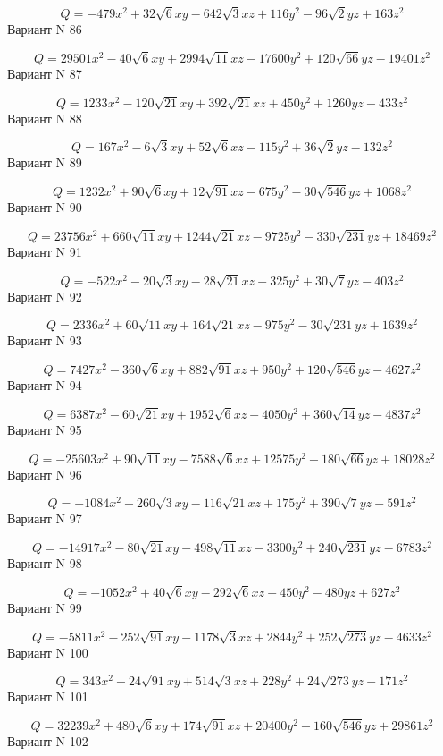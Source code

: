 \documentclass[11pt]{report}
\begin{document}
$$Q = - 479 x^{2} + 32 \sqrt{6} x y - 642 \sqrt{3} x z + 116 y^{2} - 96 \sqrt{2} y z + 163 z^{2}$$Вариант N 86

$$Q = 29501 x^{2} - 40 \sqrt{6} x y + 2994 \sqrt{11} x z - 17600 y^{2} + 120 \sqrt{66} y z - 19401 z^{2}$$Вариант N 87

$$Q = 1233 x^{2} - 120 \sqrt{21} x y + 392 \sqrt{21} x z + 450 y^{2} + 1260 y z - 433 z^{2}$$Вариант N 88

$$Q = 167 x^{2} - 6 \sqrt{3} x y + 52 \sqrt{6} x z - 115 y^{2} + 36 \sqrt{2} y z - 132 z^{2}$$Вариант N 89

$$Q = 1232 x^{2} + 90 \sqrt{6} x y + 12 \sqrt{91} x z - 675 y^{2} - 30 \sqrt{546} y z + 1068 z^{2}$$Вариант N 90

$$Q = 23756 x^{2} + 660 \sqrt{11} x y + 1244 \sqrt{21} x z - 9725 y^{2} - 330 \sqrt{231} y z + 18469 z^{2}$$Вариант N 91

$$Q = - 522 x^{2} - 20 \sqrt{3} x y - 28 \sqrt{21} x z - 325 y^{2} + 30 \sqrt{7} y z - 403 z^{2}$$Вариант N 92

$$Q = 2336 x^{2} + 60 \sqrt{11} x y + 164 \sqrt{21} x z - 975 y^{2} - 30 \sqrt{231} y z + 1639 z^{2}$$Вариант N 93

$$Q = 7427 x^{2} - 360 \sqrt{6} x y + 882 \sqrt{91} x z + 950 y^{2} + 120 \sqrt{546} y z - 4627 z^{2}$$Вариант N 94

$$Q = 6387 x^{2} - 60 \sqrt{21} x y + 1952 \sqrt{6} x z - 4050 y^{2} + 360 \sqrt{14} y z - 4837 z^{2}$$Вариант N 95

$$Q = - 25603 x^{2} + 90 \sqrt{11} x y - 7588 \sqrt{6} x z + 12575 y^{2} - 180 \sqrt{66} y z + 18028 z^{2}$$Вариант N 96

$$Q = - 1084 x^{2} - 260 \sqrt{3} x y - 116 \sqrt{21} x z + 175 y^{2} + 390 \sqrt{7} y z - 591 z^{2}$$Вариант N 97

$$Q = - 14917 x^{2} - 80 \sqrt{21} x y - 498 \sqrt{11} x z - 3300 y^{2} + 240 \sqrt{231} y z - 6783 z^{2}$$Вариант N 98

$$Q = - 1052 x^{2} + 40 \sqrt{6} x y - 292 \sqrt{6} x z - 450 y^{2} - 480 y z + 627 z^{2}$$Вариант N 99

$$Q = - 5811 x^{2} - 252 \sqrt{91} x y - 1178 \sqrt{3} x z + 2844 y^{2} + 252 \sqrt{273} y z - 4633 z^{2}$$Вариант N 100

$$Q = 343 x^{2} - 24 \sqrt{91} x y + 514 \sqrt{3} x z + 228 y^{2} + 24 \sqrt{273} y z - 171 z^{2}$$Вариант N 101

$$Q = 32239 x^{2} + 480 \sqrt{6} x y + 174 \sqrt{91} x z + 20400 y^{2} - 160 \sqrt{546} y z + 29861 z^{2}$$Вариант N 102
\end{document}
